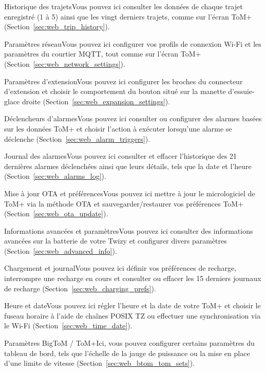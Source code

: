 {Historique des trajets}{Vous pouvez ici consulter les données de chaque trajet enregistré (1 à 5) ainsi que les vingt derniers trajets, comme sur l’écran ToM+ (Section~\ref{sec:web_trip_history}).}

{Paramètres réseau}{Vous pouvez ici configurer vos profils de connexion Wi-Fi et les paramètres du courtier MQTT, tout comme sur l’écran ToM+ (Section~\ref{sec:web_network_settings}).}

{Paramètres d’extension}{Vous pouvez ici configurer les broches du connecteur d’extension et choisir le comportement du bouton situé sur la manette d’essuie-glace droite (Section~\ref{sec:web_expansion_settings}).}

{Déclencheurs d’alarmes}{Vous pouvez ici consulter ou configurer des alarmes basées sur les données ToM+ et choisir l’action à exécuter lorsqu’une alarme se déclenche (Section~\ref{sec:web_alarm_triggers}).}

{Journal des alarmes}{Vous pouvez ici consulter et effacer l’historique des 21 dernières alarmes déclenchées ainsi que leurs détails, tels que la date et l’heure (Section~\ref{sec:web_alarms_log}).}

{Mise à jour OTA et préférences}{Vous pouvez ici mettre à jour le micrologiciel de ToM+ via la méthode OTA et sauvegarder/restaurer vos préférences ToM+ (Section~\ref{sec:web_ota_update}).}

{Informations avancées et paramètres}{Vous pouvez ici consulter des informations avancées sur la batterie de votre Twizy et configurer divers paramètres (Section~\ref{sec:web_advanced_info}).}

{Chargement et journal}{Vous pouvez ici définir vos préférences de recharge, interrompre une recharge en cours et consulter ou effacer les 15 derniers journaux de recharge (Section~\ref{sec:web_charging_prefs}).}

{Heure et date}{Vous pouvez ici régler l’heure et la date de votre ToM+ et choisir le fuseau horaire à l’aide de chaînes POSIX TZ ou effectuer une synchronisation via le Wi-Fi (Section~\ref{sec:web_time_date}).}

{Paramètres BigToM / ToM+}{Ici, vous pouvez configurer certains paramètres du tableau de bord, tels que l’échelle de la jauge de puissance ou la mise en place d’une limite de vitesse (Section~\ref{sec:web_btom_tom_sets}).}

